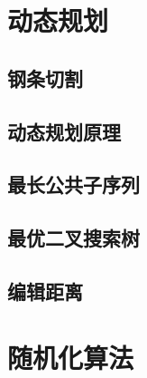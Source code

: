 \documentclass[oneside]{ctexbook}
\begin{document}
\section{动态规划}

\subsection{钢条切割}

\subsection{动态规划原理}

\subsection{最长公共子序列}

\subsection{最优二叉搜索树}

\subsection{编辑距离}

\section{随机化算法}
\end{document}
